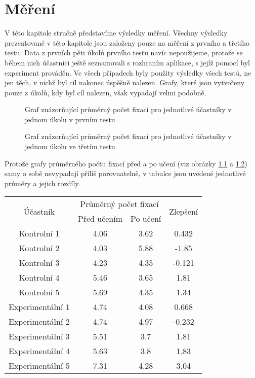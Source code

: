 \chapter{Měření}

V této kapitole stručně představíme výsledky měření. Všechny výsledky
prezentované v této kapitole jsou založeny pouze na měření z prvního a třetího
testu. Data z prvních pěti úkolů prvního testu navíc nepoužijeme, protože se
během nich účastníci ještě seznamovali s rozhraním aplikace, s jejíž pomocí byl
experiment prováděn. Ve všech případech byly použity výsledky všech testů, ne
jen těch, v nichž byl cíl nakonec úspěšně nalezen. Grafy, které jsou vytvořeny
pouze z úkolů, kdy byl cíl nalezen, však vypadají velmi podobně. 

\def\graphfigure#1#2#3{
\begin{figure}[h!]
\centering
\caption{#2}
\label{#3}
\end{figure}
}

\graphfigure{before_all}{Graf znázorňující průměrný počet fixací pro jednotlivé účastníky v jednom úkolu v prvním testu}{beforeall}

\graphfigure{after_all}{Graf znázorňující průměrný počet fixací pro jednotlivé účastníky v jednom úkolu ve třetím testu}{afterall}

Protože grafy průměrného počtu fixací před a po učení (viz obrázky \ref{beforeall} a \ref{afterall}) samy o sobě nevypadají příliš porovnatelně, v tabulce jsou uvedené jednotlivé průměry a jejich rozdíly.

\begin{center}
\begin{tabular}{cccc}
\hline
\hline
\multirow{2}{*}{Účastník} & \multicolumn{2}{c}{Průměrný počet fixací}&\multirow{2}{*}{Zlepšení} \\
&Před učením & Po učení &\\ 
\hline
Kontrolní 1       &  4.06  &3.62 & 0.432\\
Kontrolní 2     &    4.03 & 5.88 &-1.85\\ 
Kontrolní 3      &   4.23 & 4.35 &-0.121\\
Kontrolní 4    &     5.46 & 3.65 & 1.81 \\
Kontrolní 5     &    5.69 & 4.35 & 1.34 \\
Experimentální 1      &   4.74 & 4.08 & 0.668\\
Experimentální 2       &  4.74  &4.97 &-0.232\\
Experimentální 3       &  5.51 &  3.7  & 1.81 \\
Experimentální 4     &   5.63  &3.8  & 1.83 \\
Experimentální 5      &  7.31 & 4.28  &3.04 \\

\hline
\hline
\end{tabular}
\end{center}

